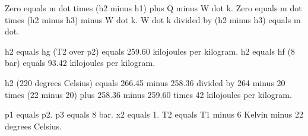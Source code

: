 Zero equals m dot times (h2 minus h1) plus Q minus W dot k.
Zero equals m dot times (h2 minus h3) minus W dot k.
W dot k divided by (h2 minus h3) equals m dot.

h2 equals hg (T2 over p2) equals 259.60 kilojoules per kilogram.
h2 equals hf (8 bar) equals 93.42 kilojoules per kilogram.

h2 (220 degrees Celsius) equals 266.45 minus 258.36 divided by 264 minus 20 times (22 minus 20) plus 258.36 minus 259.60 times 42 kilojoules per kilogram.

p1 equals p2.
p3 equals 8 bar.
x2 equals 1.
T2 equals T1 minus 6 Kelvin minus 22 degrees Celsius.